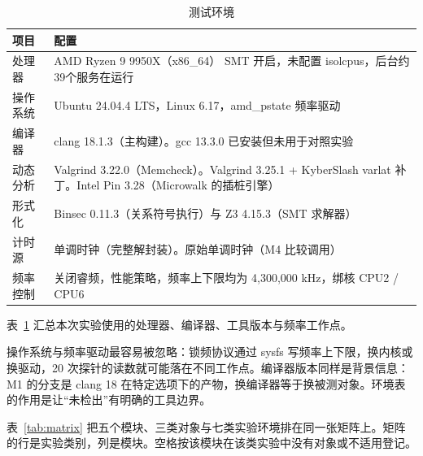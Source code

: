 \begin{table}[H]
\centering
\caption{测试环境}
\label{tab:env}
{\small
\begin{tabularx}{\textwidth}{|>{\raggedright\arraybackslash}p{2.3cm}|>{\raggedright\arraybackslash}X|}
\hline
项目 & 配置 \\
\hline
处理器 &
  AMD Ryzen 9 9950X（x86\_64）\newline
  SMT 开启，未配置 isolcpus，后台约39个服务在运行 \\
\hline
操作系统 & Ubuntu 24.04.4 LTS，Linux 6.17，amd\_pstate 频率驱动 \\
\hline
编译器 & clang 18.1.3（主构建）。gcc 13.3.0 已安装但未用于对照实验 \\
\hline
动态分析 & Valgrind 3.22.0（Memcheck）。Valgrind 3.25.1 + KyberSlash varlat 补丁。Intel Pin 3.28（Microwalk 的插桩引擎） \\
\hline
形式化 & Binsec 0.11.3（关系符号执行）与 Z3 4.15.3（SMT 求解器） \\
\hline
计时源 & 单调时钟（完整解封装）。原始单调时钟（M4 比较调用） \\
\hline
频率控制 & 关闭睿频，性能策略，频率上下限均为 4,300,000 kHz，绑核 CPU2 / CPU6 \\
\hline
\end{tabularx}
}
\end{table}

表~\ref{tab:env} 汇总本次实验使用的处理器、编译器、工具版本与频率工作点。

操作系统与频率驱动最容易被忽略：锁频协议通过 sysfs 写频率上下限，换内核或换驱动，20 次探针的读数就可能落在不同工作点。编译器版本同样是背景信息：M1 的分支是 clang 18 在特定选项下的产物，换编译器等于换被测对象。环境表的作用是让“未检出”有明确的工具边界。

表~\ref{tab:matrix} 把五个模块、三类对象与七类实验环境排在同一张矩阵上。矩阵的行是实验类别，列是模块。空格按该模块在该类实验中没有对象或不适用登记。

